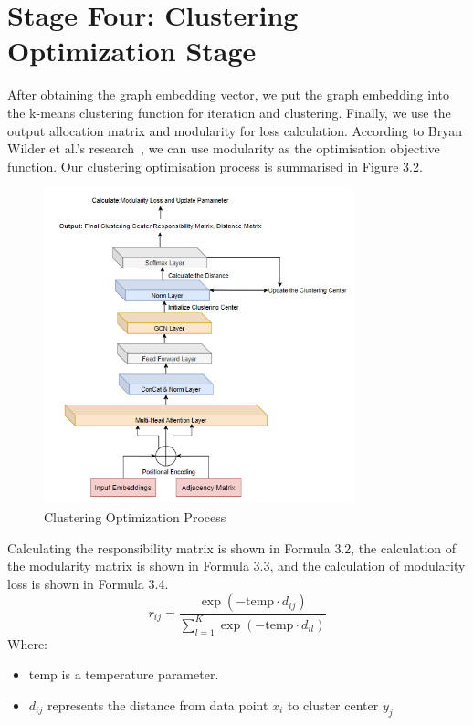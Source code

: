 \documentclass[ %
                    author={Tengyao Tu},
                supervisor={Dr. James Pope},
                    degree={MSc},
                     title={A New Perspective on Graph Community Detection: Combining Traditional Methods with Deep Learning Approaches},
                  subtitle={Applying to Telecom Networks and Diverse Datasets},
                      type={},
                      year={2024}]{dissertation}
\begin{document}
\section{Stage Four: Clustering Optimization Stage}
After obtaining the graph embedding vector, we put the graph embedding into the k-means clustering function for iteration and clustering. Finally, we use the output allocation matrix and modularity for loss calculation. According to Bryan Wilder et al.'s research~\cite{wilder2019end}, we can use modularity as the optimisation objective function. Our clustering optimisation process is summarised in Figure 3.2.
\begin{figure}[h!] %
    \centering
    \includegraphics[width=0.8\textwidth]{Figure_4.png} %
    \caption{Clustering Optimization Process}
    \label{fig: Clustering optimisation process}
\end{figure}
Calculating the responsibility matrix is shown in Formula 3.2, the calculation of the modularity matrix is shown in Formula 3.3, and the calculation of modularity loss is shown in Formula 3.4.
\begin{equation}
r_{ij} = \frac{\exp(-\text{temp} \cdot d_{ij})}{\sum_{l=1}^K \exp(-\text{temp} \cdot d_{il})}
\label{eq: Responsibility}
\end{equation}
Where:
\begin{itemize}
    \item temp is a temperature parameter.
    \item $d_{ij}$ represents the distance from data point $x_{i}$ to cluster center $y_{j}$
\end{itemize}
\end{document}
